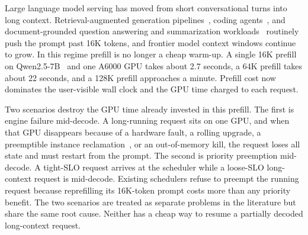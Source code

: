 
Large language model serving has moved from short conversational turns into long context. Retrieval-augmented generation pipelines~\cite{rag}, coding agents~\cite{sweagent}, and document-grounded question answering and summarization workloads~\cite{longbench,cohan2018arxiv} routinely push the prompt past 16K tokens, and frontier model context windows continue to grow. In this regime prefill is no longer a cheap warm-up. A single 16K prefill on Qwen2.5-7B~\cite{qwen25} and one A6000 GPU takes about 2.7 seconds, a 64K prefill takes about 22 seconds, and a 128K prefill approaches a minute. Prefill cost now dominates the user-visible wall clock and the GPU time charged to each request.


Two scenarios destroy the GPU time already invested in this prefill. The first is engine failure mid-decode. A long-running request sits on one GPU, and when that GPU disappears because of a hardware fault, a rolling upgrade, a preemptible instance reclamation~\cite{spotserve}, or an out-of-memory kill, the request loses all state and must restart from the prompt. The second is priority preemption mid-decode. A tight-SLO request arrives at the scheduler while a loose-SLO long-context request is mid-decode. Existing schedulers refuse to preempt the running request because reprefilling its 16K-token prompt costs more than any priority benefit. The two scenarios are treated as separate problems in the literature but share the same root cause. Neither has a cheap way to resume a partially decoded long-context request.


